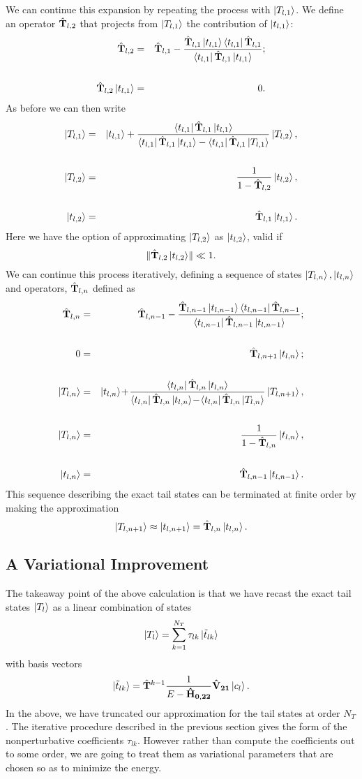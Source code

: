 \documentclass[twocolumn,secnumarabic,amssymb, nobibnotes, aps, prd]{revtex4-2}
\newcommand{\Ht}{{\hat {\bf T}}}
\newcommand{\kts}[1]{\ket{t_{l,#1}}}
\newcommand{\bts}[1]{\bra{t_{l,#1}}}
\newcommand{\kTs}[1]{\ket{T_{l,#1}}}
\newcommand{\HT}[1]{\hat{\bf T}_{l,#1}}
\begin{document}
We can continue this expansion by repeating the process with $\kTs{1}$.  We define an operator $\HT{2}$ that projects from $\kTs{1}$ the contribution of $\kts{1}$:
\begin{eqnarray}
\HT{2} &=& \HT{1} -\frac{\HT{1}\kts{1}\bts{1}\HT{1}}{\bts{1}\HT{1}\kts{1}};\cr\cr
\HT{2}\kts{1} &=& 0.
\end{eqnarray}
As before we can then write
\begin{eqnarray}
  \kTs{1} &=& \kts{1} + \frac{\bts{1}\HT{1}\kts{1}}{\bts{1}\HT{1}\kts{1}-\bts{1}\HT{1}\kTs{1}}\kTs{2},\cr\cr
  \kTs{2} &=& \frac{1}{1-\HT{2}}\kts{2},\cr\cr
  \kts{2} &=& \HT{1}\kts{1}.
\end{eqnarray}
Here we have the option of approximating $\kTs{2}$ as $\kts{2}$, valid if
$$
\lVert \HT{2}\kts{2}\rVert \ll 1.
$$
We can continue this process iteratively, defining a sequence of states $\kTs{n},\kts{n}$ and operators, $\HT{n}$ defined as
\begin{eqnarray}\label{tsn}
\HT{n} &=& \HT{n-1} -\frac{\HT{n-1}\kts{n-1}\bts{n-1}\HT{n-1}}{\bts{n-1}\HT{n-1}\kts{n-1}};\cr\cr
0 &=& \HT{n+1}\kts{n};\cr\cr
  \kTs{n} &=& \kts{n} \!+\! \frac{\bts{n}\HT{n}\kts{n}}{\bts{n}\HT{n}\kts{n}\!-\!\bts{n}\HT{n}\kTs{n}}\kTs{n+1},\cr\cr
  \kTs{n} &=& \frac{1}{1-\HT{n}}\kts{n},\cr\cr
  \kts{n} &=& \HT{n-1}\kts{n-1}.
\end{eqnarray}
This sequence describing the exact tail states can be terminated at finite order by making the approximation
\begin{equation}
    \kTs{n+1} \approx \kts{n+1}=\HT{n}\kts{n}. \label{IterTerminateGen}
\end{equation}

\newcommand{\HV}{\hat {\bf H}_V}
\newcommand{\HG}{\hat {\bf G}_V}
\newcommand{\Hlt}[1]{{\rm H}_{1t}^{(#1)}}
\newcommand{\Htl}[1]{{\rm H}_{t1}^{(#1)}}
\newcommand{\Htt}[1]{{\rm H}_{tt}^{(#1)}}
\newcommand{\G}[1]{{\rm G}^{(#1)}}

\subsection{A Variational Improvement}

The takeaway point of the above calculation is that we have recast the exact tail states $\ket{T_l}$ as a linear combination of states
\begin{equation}
    \ket{T_l} = \sum_{k=1}^{N_T}\tau_{lk} \ket{\tilde t_{lk}}
\end{equation}
with basis vectors
\begin{equation}
    \ket{\tilde t_{lk}}=\Ht^{k-1}\frac{1}{E-{\bf \hat H_{0,22}}}{\bf \hat V_{21}}\ket{c_l}.\label{tildet}
\end{equation}
In the above, we have truncated our approximation for the tail states at order $N_T$.
The iterative procedure described in the previous section gives the form of the nonperturbative coefficients $\tau_{lk}$.
However rather than compute the coefficients out to some order, we are going to treat them as variational parameters that are chosen so as to minimize the energy.  
\end{document}

